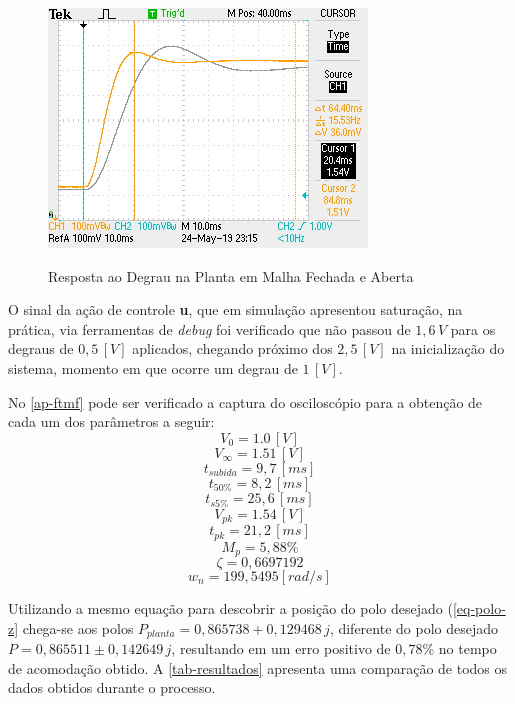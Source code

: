 \documentclass[
	12pt,				%
	article,			%
	openright,			%
	oneside,
	a4paper,			%
	chapter=TITLE,		%
	section=TITLE,		%
	english,			%
	french,				%
	spanish,			%
	brazil,				%
]{abntex2}
\begin{document}
                \begin{figure}[htbp]
                	\centering
                	\caption{Resposta ao Degrau na Planta em Malha Fechada e Aberta}
                	\includegraphics[width=\textwidth,height=240px,keepaspectratio]{imgs/ftmf/step_response.JPG}
                	\label{fig-ftmf-step}
            	\end{figure}
            	
            	O sinal da ação de controle \textbf{u}, que em simulação apresentou saturação, na prática, via ferramentas de \textit{debug} foi verificado que não passou de $1,6\,V$ para os degraus de $0,5\,[V]$ aplicados, chegando próximo dos $2,5\,[V]$ na inicialização do sistema, momento em que ocorre um degrau de $1\,[V]$.
            	
            	\FloatBarrier
                No \autoref{ap-ftmf} pode ser verificado a captura do osciloscópio para a obtenção de cada um dos parâmetros a seguir:
                $$V_{0}=1.0\,[V]$$
                $$V_{\infty}=1.51\,[V]$$
                $$t_{subida}=9,7\,[ms]$$
                $$t_{50\%}=8,2\,[ms]$$
                $$t_{s5\%}=25,6\,[ms]$$
                $$V_{pk}=1.54\,[V]$$
                $$t_{pk}=21,2\,[ms]$$
                $$M_{p}=5,88\%$$
                $$\zeta = 0,6697192 $$
                $$w_n = 199,5495 [rad/s]$$
                \FloatBarrier
                
                Utilizando a mesmo equação para descobrir a posição do polo desejado (\autoref{eq-polo-z} chega-se aos polos $P_{planta}= 0,865738 +0,129468\,j$, diferente do polo desejado $ P=0,865511 \pm 0,142649\,j $, resultando em um erro positivo de $0,78\%$ no tempo de acomodação obtido. A \autoref{tab-resultados} apresenta uma comparação de todos os dados obtidos durante o processo.
                
\end{document}
